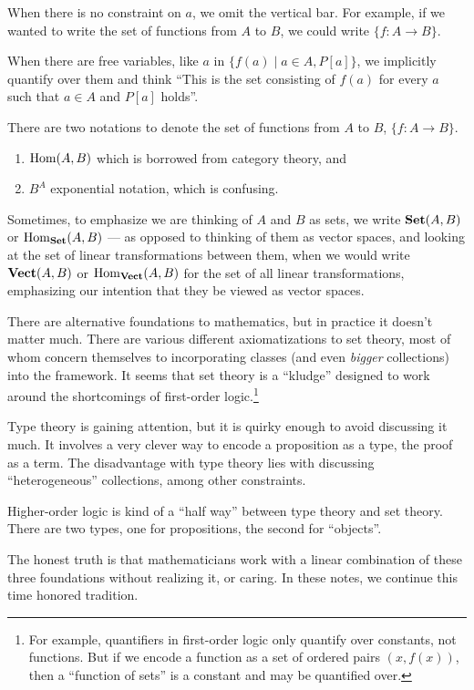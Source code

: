 When there is no constraint on $a$, we omit the vertical bar. For
example, if we wanted to write the set of functions from $A$ to $B$, we
could write $\{f\colon A\to B\}$.

\begin{remark}
When there are free variables, like $a$ in $\{f(a)\mid a\in A, P[a]\}$,
we implicitly quantify over them and think ``This is the set consisting
of $f(a)$ for every $a$ such that $a\in A$ and $P[a]$ holds''. 
\end{remark}

There are two notations to denote the set of functions from $A$ to $B$,
$\{f\colon A\to B\}$.
\begin{enumerate}
\item $\operatorname{Hom}(A,B)$ which is borrowed from category theory, and
\item $B^{A}$ exponential notation, which is confusing.
\end{enumerate}
Sometimes, to emphasize we are thinking of $A$ and $B$ as sets, we write
$\mathbf{Set}(A,B)$ or $\operatorname{Hom}_{\mathbf{Set}}(A,B)$ --- as opposed to thinking of them as
vector spaces, and looking at the set of linear transformations between
them, when we would write $\mathbf{Vect}(A,B)$ or $\operatorname{Hom}_{\mathbf{Vect}}(A,B)$ for the
set of all linear transformations, emphasizing our intention that they
be viewed as vector spaces.

There are alternative foundations to mathematics, but in practice it
doesn't matter much. There are various different axiomatizations to set
theory, most of whom concern themselves to incorporating classes (and
even \emph{bigger} collections) into the framework. It seems that set
theory is a ``kludge'' designed to work around the shortcomings of
first-order logic.\footnote{For example, quantifiers in first-order
logic only quantify over constants, not functions. But if we encode a
function as a set of ordered pairs $(x,f(x))$, then a ``function of sets'' is 
a constant and may be quantified over.}

Type theory is gaining attention, but it is quirky enough to avoid
discussing it much. It involves a very clever way to encode a
proposition as a type, the proof as a term. The disadvantage with type
theory lies with discussing ``heterogeneous'' collections, among other
constraints.

Higher-order logic is kind of a ``half way'' between type theory and set
theory. There are two types, one for propositions, the second for
``objects''.

The honest truth is that mathematicians work with a linear combination
of these three foundations without realizing it, or caring. In these
notes, we continue this time honored tradition.